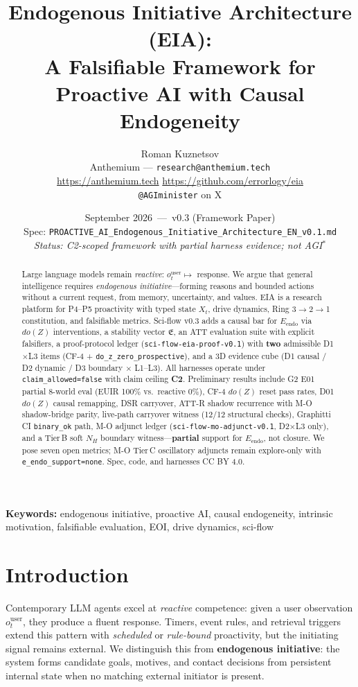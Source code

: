 \documentclass[11pt,a4paper]{article}
\title{Endogenous Initiative Architecture (EIA):\\ A Falsifiable Framework for Proactive AI with Causal Endogeneity}
\author{Roman Kuznetsov\\
Anthemium --- \texttt{research@anthemium.tech} \\
\url{https://anthemium.tech} \quad \url{https://github.com/errorlogy/eia} \\
\texttt{@AGIminister} on X
}
\date{September 2026 \,---\, v0.3 (Framework Paper) \\ \small Spec: \texttt{PROACTIVE\_AI\_Endogenous\_Initiative\_Architecture\_EN\_v0.1.md} \\ \small \textit{Status: C2-scoped framework with partial harness evidence; not AGI$^{*}$}}
\theoremstyle{definition}
\begin{document}
\maketitle

\begin{abstract}
Large language models remain \emph{reactive}: $o_t^{\mathrm{user}}\mapsto$ response. We argue that general intelligence requires \emph{endogenous initiative}---forming reasons and bounded actions without a current request, from memory, uncertainty, and values. EIA is a research platform for P4--P5 proactivity with typed state $X_t$, drive dynamics, Ring 3$\to$2$\to$1 constitution, and falsifiable metrics. Sci-flow v0.3 adds a causal bar for $E_{\mathrm{endo}}$ via $do(Z)$ interventions, a stability vector $\mathfrak{E}$, an ATT evaluation suite with explicit falsifiers, a proof-protocol ledger (\texttt{sci-flow-eia-proof-v0.1}) with \textbf{two} admissible D1$\times$L3 items (CF-4 + \texttt{do\_z\_zero\_prospective}), and a 3D evidence cube (D1 causal / D2 dynamic / D3 boundary $\times$ L1--L3). All harnesses operate under \texttt{claim\_allowed=false} with claim ceiling \textbf{C2}. Preliminary results include G2 E01 partial 8-world eval (EUIR 100\% vs.\ reactive 0\%), CF-4 $do(Z)$ reset pass rates, D01 $do(Z)$ causal remapping, DSR carryover, ATT-R shadow recurrence with M-O shadow-bridge parity, live-path carryover witness (12/12 structural checks), Graphitti CI \texttt{binary\_ok} path, M-O adjunct ledger (\texttt{sci-flow-mo-adjunct-v0.1}, D2$\times$L3 only), and a Tier\,B soft $N_H$ boundary witness---\textbf{partial} support for $E_{\mathrm{endo}}$, not closure. We pose seven open metrics; M-O Tier\,C oscillatory adjuncts remain explore-only with \texttt{e\_endo\_support=none}. Spec, code, and harnesses CC BY 4.0.
\end{abstract}

\noindent\textbf{Keywords:} endogenous initiative, proactive AI, causal endogeneity, intrinsic motivation, falsifiable evaluation, EOI, drive dynamics, sci-flow

\section{Introduction}\label{sec:intro}
Contemporary LLM agents excel at \emph{reactive} competence: given a user observation $o_t^{\mathrm{user}}$, they produce a fluent response. Timers, event rules, and retrieval triggers extend this pattern with \emph{scheduled} or \emph{rule-bound} proactivity, but the initiating signal remains external. We distinguish this from \textbf{endogenous initiative}: the system forms candidate goals, motives, and contact decisions from persistent internal state when no matching external initiator is present.
\end{document}
